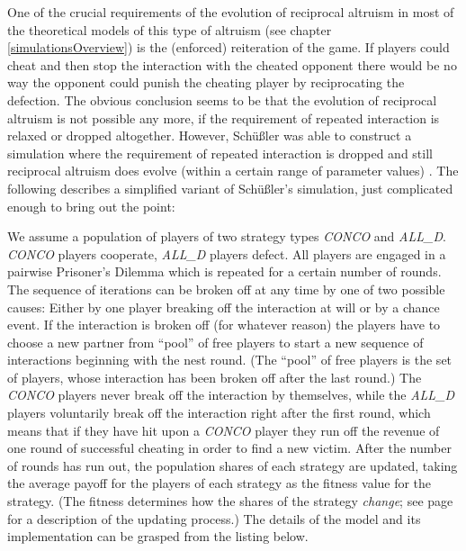 One of the crucial requirements of the evolution of reciprocal
altruism in most of the theoretical models of this type of altruism
(see chapter \ref{simulationsOverview}) is the (enforced) reiteration
of the game. If players could cheat and then stop the interaction with
the cheated opponent there would be no way the opponent could punish
the cheating player by reciprocating the defection. The obvious
conclusion seems to be that the evolution of reciprocal altruism is
not possible any more, if the requirement of repeated interaction is
relaxed or dropped altogether. However, Schüßler was able to
construct a simulation where the requirement of repeated interaction
is dropped and still reciprocal altruism does evolve (within a certain
range of parameter values) \cite[p. 61ff.]{schuessler:1997}. The
following describes a simplified variant of Schüßler's simulation, just
complicated enough to bring out the point:

We assume a population of players of two strategy types {\em CONCO}
and {\em ALL\_D}. {\em CONCO} players cooperate, {\em ALL\_D} players
defect. All players are engaged in a pairwise Prisoner's Dilemma which
is repeated for a certain number of rounds. The sequence of iterations
can be broken off at any time by one of two possible causes: Either by
one player breaking off the interaction at will or by a chance event.
If the interaction is broken off (for whatever reason) the players
have to choose a new partner from ``pool'' of free players to start a
new sequence of interactions beginning with the nest round. (The
``pool'' of free players is the set of players, whose interaction has
been broken off after the last round.) The {\em CONCO} players never
break off the interaction by themselves, while the {\em ALL\_D} players
voluntarily break off the interaction right after the first round,
which means that if they have hit upon a {\em CONCO} player they run
off the revenue of one round of successful cheating in order to find a
new victim. After the number of rounds has run out, the population
shares of each strategy are updated, taking the average payoff for the
players of each strategy as the fitness value for the strategy. (The
fitness determines how the shares of the strategy {\em change}; see
page \pageref{populationEquation} for a description of the updating
process.) The details of the model and its implementation can be
grasped from the listing below. 


